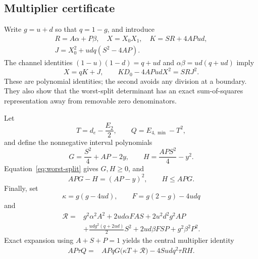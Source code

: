 \documentclass[pra,aps,twocolumn,nofootinbib,superscriptaddress]{revtex4-2}
\begin{document}
\subsection{Multiplier certificate}

Write $g=u+d$ so that $q=1-g$, and introduce
\begin{gather}
R=A\alpha+P\beta,\quad X=X_0X_1,\quad K=SR+4APud,\nonumber\\
J=X_0^2+udq(S^2-4AP).
\end{gather}
The channel identities $(1-u)(1-d)=q+ud$ and
$\alpha\beta=ud(q+ud)$ imply
\begin{equation}
X=qK+J,\qquad KD_0-4APudX^2=SRJ^2.
\label{eq:D0-compression}
\end{equation}
These are polynomial identities; the second avoids any division at a
boundary.  They also show that the worst-split determinant has an exact
sum-of-squares representation away from removable zero denominators.

Let
\begin{equation}
T=d_e-\frac{E_2}{2},\qquad Q=E_{4,\min}-T^2,
\end{equation}
and define the nonnegative interval polynomials
\begin{equation}
G=\frac{S^2}{4}+AP-2y,\qquad
H=\frac{APS^2}{4}-y^2.
\label{eq:GH}
\end{equation}
Equation~\eqref{eq:worst-split} gives $G,H\geq0$, and
\begin{equation}
APG-H=(AP-y)^2,\qquad H\leq APG.
\label{eq:H-bound}
\end{equation}
Finally, set
\begin{equation}
\kappa=g(g-4ud),\qquad F=g(2-g)-4udq
\end{equation}
and
\begin{align}
\mathcal R={}&g^2\alpha^2A^2+2ud\alpha FAS
+2u^2d^2g^2AP\nonumber\\
&+\frac{udg^2(q+2ud)}{2}S^2+2ud\beta FSP
+g^2\beta^2P^2.
\label{eq:Rcal}
\end{align}
Exact expansion using $A+S+P=1$ yields the central multiplier identity
\begin{align}
AP\tau Q={}&APqG\bigl(\kappa T+\mathcal R\bigr)
-4Sudq^2\tau R H.
\label{eq:multiplier}
\end{align}
\end{document}

